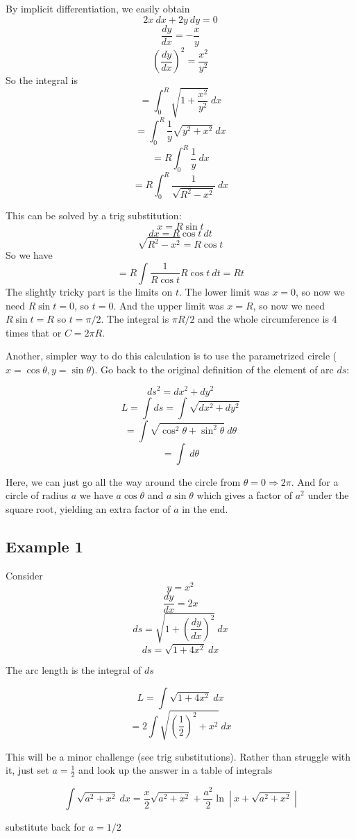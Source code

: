 \documentclass[11pt, oneside]{report}   	%
\begin{document}
By implicit differentiation, we easily obtain
\[ 2x \ dx + 2y \ dy = 0 \]
\[ \frac{dy}{dx} = -\frac{x}{y} \]
\[ (\frac{dy}{dx})^2 = \frac{x^2}{y^2} \]
So the integral is
\[ = \int_0^R  \sqrt{1 + \frac{x^2}{y^2}} \ dx \]
\[ = \int_0^R \frac{1}{y}  \sqrt{y^2 + x^2} \ dx \]
\[ = R \int_0^R \frac{1}{y}  \ dx \]
\[ = R \int_0^R \frac{1}{\sqrt{R^2-x^2}}  \ dx \]

This can be solved by a trig substitution:
\[ x = R \sin t \]
\[ dx = R \cos t \ dt \]
\[ \sqrt{R^2 - x^2} = R \cos t \]
So we have
\[ = R \int \frac{1}{R \cos t} R \cos t \ dt = R t \]
The slightly tricky part is the limits on $t$.  The lower limit was $x=0$, so now we need $R \sin t = 0$, so $t=0$.  And the upper limit was $x=R$, so now we need $R \sin t = R$ so $t = \pi/2$.  The integral is $\pi R/2$ and the whole circumference is $4$ times that or $C = 2 \pi R$.

Another, simpler way to do this calculation is to use the parametrized circle ($x = \cos \theta, y = \sin \theta$).  Go back to the original definition of the element of arc $ds$:

\[ ds^2 = dx^2 + dy^2 \]
\[ L = \int ds = \int \sqrt{dx^2 + dy^2} \]
\[ = \int \sqrt{\cos^2 \theta + \sin^2 \theta} \ d \theta \]
\[ = \int \ d \theta \]

Here, we can just go all the way around the circle from $\theta = 0 \Rightarrow 2 \pi$.  And for a circle of radius $a$ we have $a \cos \theta$ and $a \sin \theta$ which gives a factor of $a^2$ under the square root, yielding an extra factor of $a$ in the end.

\subsection*{Example 1}
Consider
\[ y = x^2 \]
\[ \frac{dy}{dx} = 2x \]
\[ ds = \sqrt{1 + (\frac{dy}{dx})^2} \ dx \]
\[ ds =  \sqrt{1 + 4x^2} \ dx \]

The arc length is the integral of $ds$

\[ L = \int  \sqrt{1 + 4x^2} \ dx \]
\[ = 2 \int  \sqrt{(\frac{1}{2})^2 + x^2} \ dx \]

This will be a minor challenge (see trig substitutions).  Rather than struggle with it, just set $a = \frac{1}{2}$ and look up the answer in a table of integrals

\[ \int  \sqrt{a^2 + x^2} \ dx  = \frac{x}{2}\sqrt{a^2 + x^2} + \frac{a^2}{2} \ln \ | \ x + \sqrt{a^2 + x^2} \ | \]

substitute back for $a = 1/2$
\end{document}

